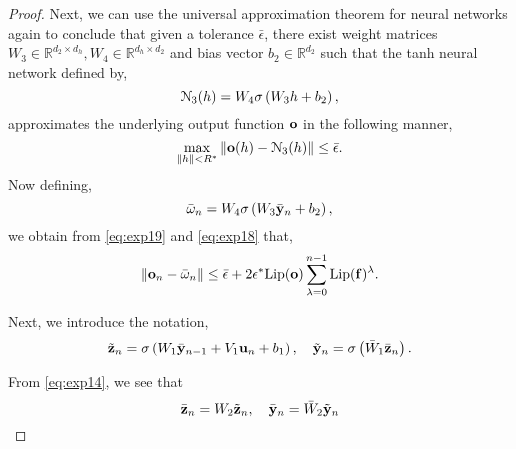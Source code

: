 \documentclass{article} \usepackage{iclr2022_conference,times}
\newcommand{\by}{{\bf y}}
\newcommand{\bz}{{\bf z}}
\newcommand{\bu}{{\bf u}}
\newcommand{\bo}{{\bf o}}
\newcommand{\R}{{\mathbb R}}
\newcommand{\cN}{\EuScript{N}}
\newcommand{\bif}{{\bf f}}
\newcommand{\bom}{{\bf \omega}}
\begin{document}
\begin{proof}
Next, we can use the universal approximation theorem for neural networks again to conclude that given a tolerance $\bar{\epsilon}$, there exist weight matrices $W_3 \in \R^{d_2 \times d_h}, W_4 \in \R^{d_h \times d_2}$ and bias vector $b_2 \in \R^{d_2}$ such that the tanh neural network defined by,
\begin{equation}
\label{eq:n3}
\cN_3(h) = W_4\sigma\left(W_3 h + b_2 \right),
\end{equation}
approximates the underlying output function $\bo$ in the following manner, 
\begin{equation}
    \label{eq:exp19}
    \max\limits_{\|h\|< R^{\ast}} \|\bo(h) - \cN_3(h) \| \leq \bar{\epsilon}.
\end{equation}
Now defining, 
\begin{equation}
    \label{eq:exp110}
    \bar{\bom}_n = W_4\sigma\left(W_3 \bar{\by}_n + b_2 \right),
\end{equation}
we obtain from \eqref{eq:exp19} and \eqref{eq:exp18} that, 
\begin{equation}
    \label{eq:exp111}
     \|\bo_n - \bar{\bom}_n\| \leq \bar{\epsilon} + 2 \epsilon^{\ast} {\rm Lip}(\bo)\sum_{\lambda=0}^{n-1}{\rm Lip}(\bif)^\lambda.
\end{equation}

Next, we introduce the notation, 
\begin{equation}
    \label{eq:exp16}
    \tilde{\bz}_n = \sigma\left(W_1 \bar{\by}_{n-1} + V_1 \bu_n + b_1 \right), \quad \tilde{\by}_n =  \sigma\left(\bar{W}_1 \bar{\bz}_n \right).
\end{equation}





From \eqref{eq:exp14}, we see that
\begin{equation}
    \label{eq:exp17}
    \bar{\bz}_n = W_2 \tilde{\bz}_n, \quad \bar{\by}_n = \bar{W}_2 \tilde{\by}_n
\end{equation}


\end{proof}
\end{document}

